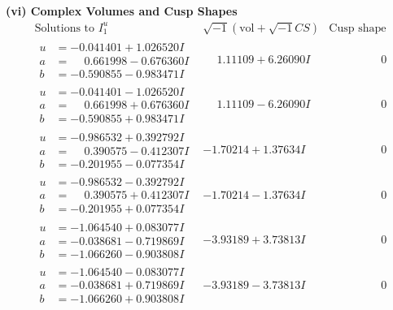 \documentclass[1p]{elsarticle_modified}
\theoremstyle{definition}
\newcommand{\I}{\sqrt{-1}}
\begin{document}
\newpage\flushleft \textbf{(vi) Complex Volumes and Cusp Shapes}
$$\begin{array}{c|c|c}  
\text{Solutions to }I^u_{1}& \I (\text{vol} + \sqrt{-1}CS) & \text{Cusp shape}\\
 \hline 
\begin{aligned}
u &= -0.041401 + 1.026520 I \\
a &= \phantom{-}0.661998 - 0.676360 I \\
b &= -0.590855 - 0.983471 I\end{aligned}
 & \phantom{-}1.11109 + 6.26090 I & \phantom{-0.000000 } 0 \\ \hline\begin{aligned}
u &= -0.041401 - 1.026520 I \\
a &= \phantom{-}0.661998 + 0.676360 I \\
b &= -0.590855 + 0.983471 I\end{aligned}
 & \phantom{-}1.11109 - 6.26090 I & \phantom{-0.000000 } 0 \\ \hline\begin{aligned}
u &= -0.986532 + 0.392792 I \\
a &= \phantom{-}0.390575 - 0.412307 I \\
b &= -0.201955 - 0.077354 I\end{aligned}
 & -1.70214 + 1.37634 I & \phantom{-0.000000 } 0 \\ \hline\begin{aligned}
u &= -0.986532 - 0.392792 I \\
a &= \phantom{-}0.390575 + 0.412307 I \\
b &= -0.201955 + 0.077354 I\end{aligned}
 & -1.70214 - 1.37634 I & \phantom{-0.000000 } 0 \\ \hline\begin{aligned}
u &= -1.064540 + 0.083077 I \\
a &= -0.038681 - 0.719869 I \\
b &= -1.066260 - 0.903808 I\end{aligned}
 & -3.93189 + 3.73813 I & \phantom{-0.000000 } 0 \\ \hline\begin{aligned}
u &= -1.064540 - 0.083077 I \\
a &= -0.038681 + 0.719869 I \\
b &= -1.066260 + 0.903808 I\end{aligned}
 & -3.93189 - 3.73813 I & \phantom{-0.000000 } 0 \\ \hline\begin{aligned}

\end{aligned}
\end{array}$$
\end{document}

